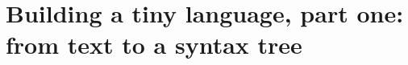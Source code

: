 \chapter{Building a tiny language, part one: from text to a syntax tree}
\label{ch:building-a-tiny-language-part-one-from}

